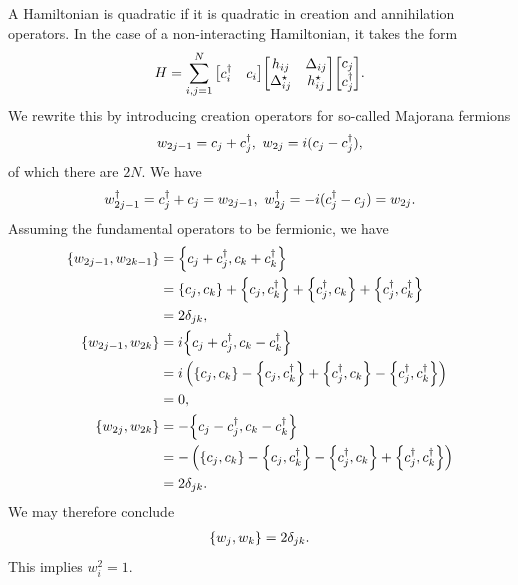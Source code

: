 A Hamiltonian is quadratic if it is quadratic in creation and annihilation operators. In the case of a non-interacting Hamiltonian, it takes the form
\begin{align*}
	H = \sum\limits_{i, j = 1}^{N}\mqty[
		c_{i}\adj & c_{i}
	]\mqty[
		h_{ij}         & \Delta_{ij} \\
		\Delta_{ij}\cc & h_{ij}\cc
	]\mqty[
		c_{j} \\
		c_{j}\adj
	].
\end{align*}
We rewrite this by introducing creation operators for so-called Majorana fermions
\begin{align*}
	w_{2j - 1} = c_{j} + c_{j}^{\dagger},\ w_{2j} = i(c_{j} - c_{j}^{\dagger}),
\end{align*}
of which there are $2N$. We have
\begin{align*}
	w_{2j - 1}^{\dagger} = c_{j}^{\dagger} + c_{j} = w_{2j - 1},\ w_{2j}^{\dagger} = -i(c_{j}^{\dagger} - c_{j}) = w_{2j}.
\end{align*}
Assuming the fundamental operators to be fermionic, we have
\begin{align*}
	\acomm{w_{2j - 1}}{w_{2k - 1}} &= \acomm{c_{j} + c_{j}\adj}{c_{k} + c_{k}\adj} \\
	                               &= \acomm{c_{j}}{c_{k}} + \acomm{c_{j}}{c_{k}\adj}+ \acomm{c_{j}\adj}{c_{k}}+ \acomm{c_{j}\adj}{c_{k}\adj} \\
	                               &= 2\delta_{jk}, \\
	\acomm{w_{2j - 1}}{w_{2k}}     &= i\acomm{c_{j} + c_{j}\adj}{c_{k} - c_{k}\adj} \\
	                               &= i\left(\acomm{c_{j}}{c_{k}} - \acomm{c_{j}}{c_{k}\adj} + \acomm{c_{j}\adj}{c_{k}} - \acomm{c_{j}\adj}{c_{k}\adj}\right) \\
	                               &= 0, \\
	\acomm{w_{2j}}{w_{2k}}         &= -\acomm{c_{j} - c_{j}\adj}{c_{k} - c_{k}\adj} \\
	                               &= -\left(\acomm{c_{j}}{c_{k}} - \acomm{c_{j}}{c_{k}\adj} - \acomm{c_{j}\adj}{c_{k}} + \acomm{c_{j}\adj}{c_{k}\adj}\right) \\
	                               &= 2\delta_{jk}.
\end{align*}
We may therefore conclude
\begin{align*}
	\acomm{w_{j}}{w_{k}} = 2\delta_{jk}.
\end{align*}
This implies $w_{i}^{2} = 1$.

